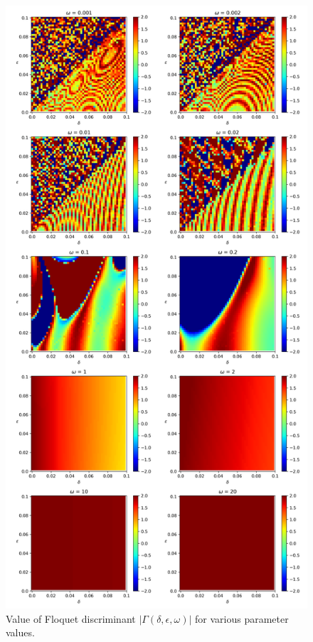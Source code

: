 \documentclass[12pt, a4paper]{article}
\begin{document}
\begin{enumerate}
\begin{enumerate}
        \begin{figure}[H]
            \centering
            \includegraphics[width=12cm]{Gamma_multi.png}
            \caption{Value of Floquet discriminant $|\Gamma(\delta, \epsilon, \omega)|$ for various parameter values.}
        \end{figure}


\end{enumerate}
\end{enumerate}
\end{document}
